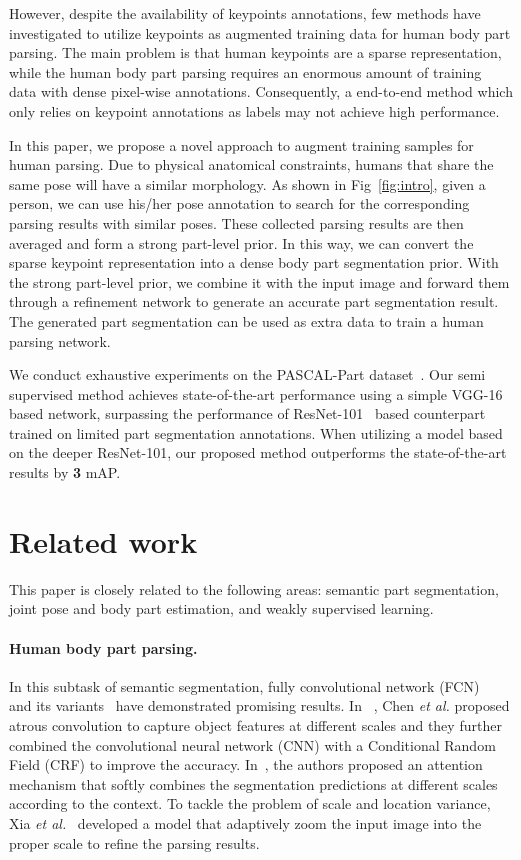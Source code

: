 \documentclass[10pt,twocolumn,letterpaper]{article}
\begin{document}
However, despite the availability of keypoints annotations, few methods have investigated to utilize keypoints as augmented training data for human body part parsing. The main problem is that human keypoints are a sparse representation, while the human body part parsing requires an enormous amount of training data with dense pixel-wise annotations. Consequently, a end-to-end method which only relies on keypoint annotations as labels may not achieve high performance.

In this paper, we propose a novel approach to augment training samples for human parsing. Due to physical anatomical constraints, humans that share the same pose will have a similar morphology. As shown in Fig~\ref{fig:intro}, given a person, we can use his/her pose annotation to search for the corresponding parsing results with similar poses. These collected parsing results are then averaged and form a strong part-level prior.  In this way, we can convert the sparse keypoint representation into a dense body part segmentation prior. With the strong part-level prior, we combine it with the input image and forward them through a refinement network to generate an accurate part segmentation result. The generated part segmentation can be used as extra data to train a human parsing network.

We conduct exhaustive experiments on the PASCAL-Part dataset~\cite{chen2014detect}. Our semi supervised method achieves state-of-the-art performance using a simple VGG-16~\cite{simonyan2014very} based network, surpassing the performance of ResNet-101~\cite{he2016deep} based counterpart trained on limited part segmentation annotations. When utilizing a model based on the deeper ResNet-101, our proposed method outperforms the state-of-the-art results by \textbf{3} mAP.

\section{Related work}
This paper is closely related to the following areas: semantic part segmentation, joint pose and body part estimation, and weakly supervised learning.
\vspace{-3mm}
\paragraph{Human body part parsing.} In this subtask of semantic segmentation, fully convolutional network (FCN)~\cite{long2015fully} and its variants~\cite{chen2015deeplab,chen2016attention,xia2016zoom} have demonstrated promising results. In ~\cite{chen2015deeplab}, Chen \emph{et al.} proposed atrous convolution to capture object features at different scales and they further combined the convolutional neural network (CNN) with a Conditional Random Field (CRF) to improve the accuracy. In~\cite{chen2016attention}, the authors proposed an attention mechanism that softly combines the segmentation predictions at different scales according to the context. To tackle the problem of scale and location variance, Xia \emph{et al.}~\cite{xia2016zoom} developed a model that adaptively zoom the input image into the proper scale to refine the parsing results.
\end{document}
